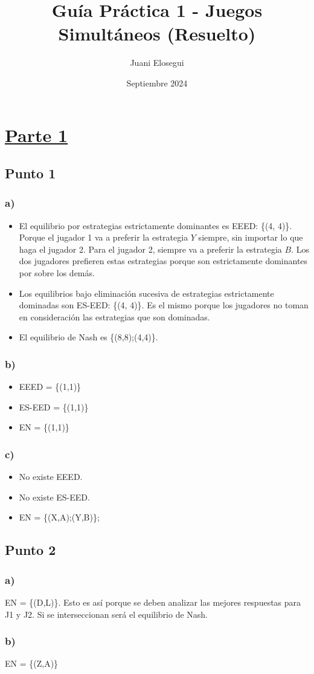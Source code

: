 \documentclass{article}
\title{Guía Práctica 1 - Juegos Simultáneos (Resuelto)}
\author{Juani Elosegui}
\date{Septiembre 2024}
\begin{document}
    \maketitle

    \section*{\underline{Parte 1}}
        \subsection*{Punto 1}
            \subsubsection*{a)}
                \begin{itemize}
                    \item El equilibrio por estrategias estrictamente dominantes es EEED: \{(4, 4)\}. Porque el jugador 1 va a preferir la estrategia $Y$ siempre, sin importar lo que haga el jugador 2. Para el jugador 2, siempre va a preferir la estrategia $B$. Los dos jugadores prefieren estas estrategias porque son estrictamente dominantes por sobre los demás.
                    \item Los equilibrios bajo eliminación sucesiva de estrategias estrictamente dominadas son ES-EED: \{(4, 4)\}. Es el mismo porque los jugadores no toman en consideración las estrategias que son dominadas.
                    \item El equilibrio de Nash es \{(8,8);(4,4)\}.
                \end{itemize}
            \subsubsection*{b)}
                \begin{itemize}
                    \item EEED = \{(1,1)\}
                    \item ES-EED = \{(1,1)\}
                    \item EN = \{(1,1)\}
                \end{itemize}
            \subsubsection*{c)}
                \begin{itemize}
                    \item No existe EEED.
                    \item No existe ES-EED.
                    \item EN = \{(X,A);(Y,B)\};
                \end{itemize}

        \subsection*{Punto 2}
            \subsubsection*{a)}
                EN = \{(D,L)\}. Esto es así porque se deben analizar las mejores respuestas para J1 y J2. Si se interseccionan será el equilibrio de Nash.
            \subsubsection*{b)}
                EN = \{(Z,A)\}
\end{document}
